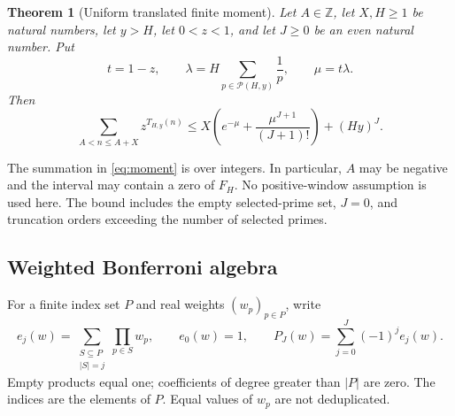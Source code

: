 \documentclass[11pt,a4paper]{article}
\newtheorem{theorem}{Theorem}[section]
\theoremstyle{definition}
\theoremstyle{remark}
\numberwithin{equation}{section}
\newcommand{\Z}{\mathbb Z}
\newcommand{\Pset}{\mathcal P}
\begin{document}
\begin{theorem}[Uniform translated finite moment]\label{thm:moment}
Let $A\in\Z$, let $X,H\ge1$ be natural numbers, let $y>H$, let $0<z<1$, and
let $J\ge0$ be an even natural number. Put
\begin{equation}\label{eq:mass}
 t=1-z,\qquad \lambda=H\sum_{p\in\Pset(H,y)}\frac1p,\qquad \mu=t\lambda.
\end{equation}
Then
\begin{equation}\label{eq:moment}
 \sum_{A<n\le A+X}z^{T_{H,y}(n)}
 \le X\left(e^{-\mu}+\frac{\mu^{J+1}}{(J+1)!}\right)+(Hy)^J.
\end{equation}
\end{theorem}
The summation in \eqref{eq:moment} is over integers. In particular, $A$ may be
negative and the interval may contain a zero of $F_H$. No positive-window
assumption is used here. The bound includes the empty selected-prime set,
$J=0$, and truncation orders exceeding the number of selected primes.

\subsection{Weighted Bonferroni algebra}
For a finite index set $P$ and real weights $(w_p)_{p\in P}$, write
\[
 e_j(w)=\sum_{\substack{S\subseteq P\\|S|=j}}\prod_{p\in S}w_p,
 \qquad e_0(w)=1,
 \qquad P_J(w)=\sum_{j=0}^J(-1)^j e_j(w).
\]
Empty products equal one; coefficients of degree greater than $|P|$ are zero.
The indices are the elements of $P$. Equal values of $w_p$ are not deduplicated.
\end{document}
